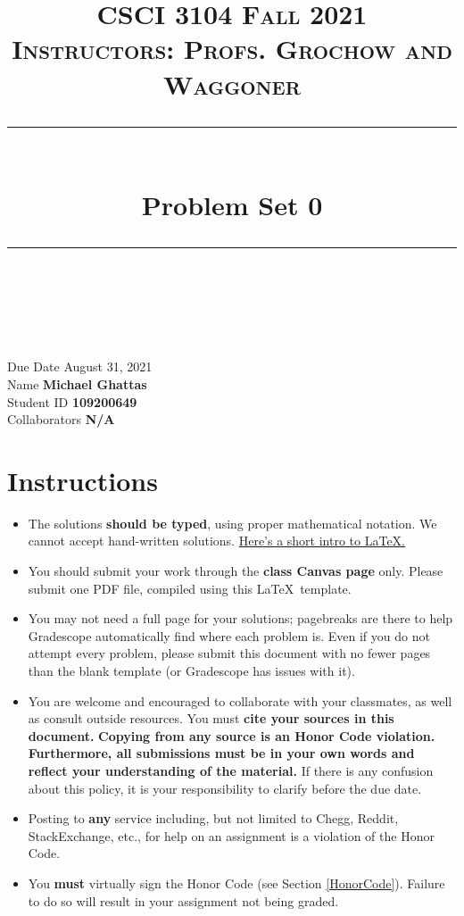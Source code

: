 \documentclass[11pt]{article}
\title{
\normalfont \normalsize 
\textsc{CSCI 3104 Fall 2021 \\ 
Instructors: Profs. Grochow and Waggoner} \\
[10pt] 
\rule{\linewidth}{0.5pt} \\[6pt] 
\huge Problem Set 0 \\
\rule{\linewidth}{2pt}  \\[10pt]
}
\date{}
\theoremstyle{definition}
\theoremstyle{definition}
\theoremstyle{definition}
\begin{document}
\maketitle


\noindent
Due Date \dotfill August 31, 2021 \\
Name \dotfill \textbf{Michael Ghattas} \\
Student ID \dotfill \textbf{109200649} \\
Collaborators \dotfill \textbf{N/A}

\tableofcontents

\section{Instructions}
 \begin{itemize}
	\item The solutions \textbf{should be typed}, using proper mathematical notation. We cannot accept hand-written solutions. \href{http://ece.uprm.edu/~caceros/latex/introduction.pdf}{Here's a short intro to \LaTeX.}
	\item You should submit your work through the \textbf{class Canvas page} only. Please submit one PDF file, compiled using this \LaTeX \ template.
	\item You may not need a full page for your solutions; pagebreaks are there to help Gradescope automatically find where each problem is. Even if you do not attempt every problem, please submit this document with no fewer pages than the blank template (or Gradescope has issues with it).

	\item You are welcome and encouraged to collaborate with your classmates, as well as consult outside resources. You must \textbf{cite your sources in this document.} \textbf{Copying from any source is an Honor Code violation. Furthermore, all submissions must be in your own words and reflect your understanding of the material.} If there is any confusion about this policy, it is your responsibility to clarify before the due date. 

	\item Posting to \textbf{any} service including, but not limited to Chegg, Reddit, StackExchange, etc., for help on an assignment is a violation of the Honor Code.

	\item You \textbf{must} virtually sign the Honor Code (see Section \ref{HonorCode}). Failure to do so will result in your assignment not being graded.
\end{itemize}
\end{document}
